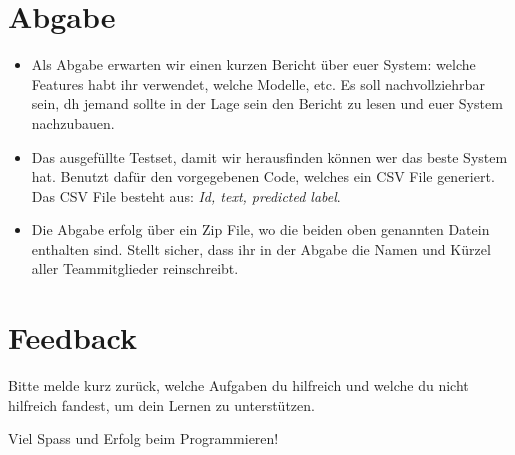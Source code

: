 \documentclass[a4paper,10pt]{article}
\begin{document}
\section{Abgabe}
\begin{itemize}
\item Als Abgabe erwarten wir einen kurzen Bericht über euer System: welche Features habt ihr verwendet, welche Modelle, etc. Es soll nachvollziehrbar sein, dh jemand sollte in der Lage sein den Bericht zu lesen und euer System nachzubauen. 
\item Das ausgefüllte Testset, damit wir herausfinden können wer das beste System hat. Benutzt dafür den vorgegebenen Code, welches ein CSV File generiert. Das CSV File besteht aus: \emph{Id, text, predicted label}.
\item Die Abgabe erfolg über ein Zip File, wo die beiden oben genannten Datein enthalten sind. Stellt sicher, dass ihr in der Abgabe die Namen und Kürzel aller Teammitglieder reinschreibt.
\end{itemize}
\section{Feedback}
Bitte melde kurz zurück, welche Aufgaben du hilfreich und welche du nicht hilfreich fandest, um dein Lernen zu unterstützen.

\hfil Viel Spass und Erfolg beim Programmieren!
\end{document}
